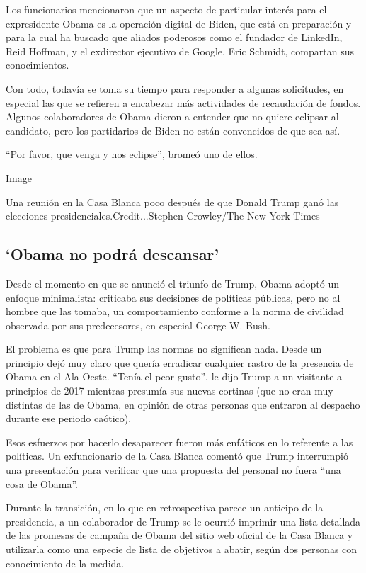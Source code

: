 Los funcionarios mencionaron que un aspecto de particular interés para
el expresidente Obama es la operación digital de Biden, que está en
preparación y para la cual ha buscado que aliados poderosos como el
fundador de LinkedIn, Reid Hoffman, y el exdirector ejecutivo de Google,
Eric Schmidt, compartan sus conocimientos.

Con todo, todavía se toma su tiempo para responder a algunas
solicitudes, en especial las que se refieren a encabezar más actividades
de recaudación de fondos. Algunos colaboradores de Obama dieron a
entender que no quiere eclipsar al candidato, pero los partidarios de
Biden no están convencidos de que sea así.

``Por favor, que venga y nos eclipse'', bromeó uno de ellos.

Image

Una reunión en la Casa Blanca poco después de que Donald Trump ganó las
elecciones presidenciales.Credit...Stephen Crowley/The New York Times

\hypertarget{obama-no-podruxe1-descansar}{%
\subsection{`Obama no podrá
descansar'}\label{obama-no-podruxe1-descansar}}

Desde el momento en que se anunció el triunfo de Trump, Obama adoptó un
enfoque minimalista: criticaba sus decisiones de políticas públicas,
pero no al hombre que las tomaba, un comportamiento conforme a la norma
de civilidad observada por sus predecesores, en especial George W. Bush.

El problema es que para Trump las normas no significan nada. Desde un
principio dejó muy claro que quería erradicar cualquier rastro de la
presencia de Obama en el Ala Oeste. ``Tenía el peor gusto'', le dijo
Trump a un visitante a principios de 2017 mientras presumía sus nuevas
cortinas (que no eran muy distintas de las de Obama, en opinión de otras
personas que entraron al despacho durante ese periodo caótico).

Esos esfuerzos por hacerlo desaparecer fueron más enfáticos en lo
referente a las políticas. Un exfuncionario de la Casa Blanca comentó
que Trump interrumpió una presentación para verificar que una propuesta
del personal no fuera ``una cosa de Obama''.

Durante la transición, en lo que en retrospectiva parece un anticipo de
la presidencia, a un colaborador de Trump se le ocurrió imprimir una
lista detallada de las promesas de campaña de Obama del sitio web
oficial de la Casa Blanca y utilizarla como una especie de lista de
objetivos a abatir, según dos personas con conocimiento de la medida.

